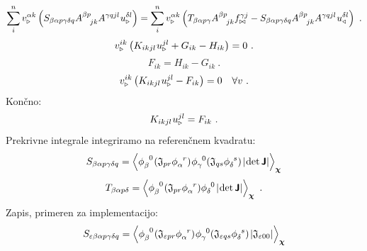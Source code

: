 \begin{equation*}
   \sum^n_i v^{\alpha k}_{\triangleright} \left(
   S_{\beta \alpha p \gamma \delta q} A^{\beta p}_{\mkern18mu jk} A^{\gamma qjl} \mkern1mu u^{\delta l}_\triangleright \right)
   =
   \sum^n_i v^{\alpha k}_{\triangleright} \left(
   T_{\beta \alpha p \gamma} A^{\beta p}_{\mkern18mu jk} f^{\gamma j}_{\bowtie}
   -
   S_{\beta \alpha p \gamma \delta q} A^{\beta p}_{\mkern18mu jk} A^{\gamma qjl} \mkern1mu u^{\delta l}_\triangleleft \right) \ .
\end{equation*}
\begin{equation*}
   v^{i k}_{\triangleright} \left(
   K_{i k j l} \mkern1mu u^{j l}_\triangleright
   +
   G_{i k}
   -
   H_{i k}
   \right) = 0 \ .
\end{equation*}
\begin{equation*}
   F_{i k} = H_{i k} - G_{i k} \ .
\end{equation*}
\begin{equation*}
   v^{i k}_{\triangleright} \left(
   K_{i k j l} \mkern1mu u^{j l}_\triangleright
   -
   F_{i k}
   \right) = 0 \quad \forall v \ .
\end{equation*}
Končno:
\begin{equation}
   K_{i k j l} \mkern1mu u^{j l}_\triangleright
   =
   F_{i k} \ .
\end{equation}
Prekrivne integrale integriramo na referenčnem kvadratu:
\begin{equation}
   S_{\beta \alpha p \gamma \delta q} = \left\langle \phi^{\phantom{\beta}0}_\beta \mkern1mu ( \mathfrak{J}_{pr} \phi^{\phantom{\alpha}r}_\alpha ) \mkern1mu \phi^{\phantom{\gamma}0}_\gamma ( \mathfrak{J}_{qs}  \phi^{\phantom{\delta}s}_\delta ) \mkern2mu |\mkern-2mu \det \bm{\mathsf{J}}| \right\rangle_{\bm{\chi}}
\end{equation}
\begin{equation}
   T_{\beta \alpha p \delta} = \left\langle \phi^{\phantom{\beta}0}_\beta\mkern1mu ( \mathfrak{J}_{pr} \phi^{\phantom{\alpha}r}_\alpha ) \phi^{\phantom{\delta}0}_\delta \mkern2mu |\mkern-2mu \det \mathbsf{J}| \right\rangle_{\bm{\chi}} \ .
\end{equation}
Zapis, primeren za implementacijo:
\begin{equation}
   S_{\varepsilon \beta \alpha p \gamma \delta q}
   =
   \left\langle \phi^{\phantom{\beta}0}_\beta
   \mkern1mu
   ( \mathfrak{J}_{\varepsilon  pr}
   \phi^{\phantom{\alpha}r}_\alpha )
   \mkern1mu
   \phi^{\phantom{\gamma}0}_\gamma
   ( \mathfrak{J}_{\varepsilon qs}
   \phi^{\phantom{\delta}s}_\delta )
   \mkern2mu
   |\mathfrak{J}_{\varepsilon 00}| \right\rangle_{\bm{\chi}}
\end{equation}
